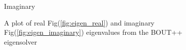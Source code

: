 \documentclass[12pt,a4paper]{article}
\begin{document}
\begin{figure}[H]
\begin{minipage}[H]{0.75\textwidth}
		\caption{Imaginary}
		\label{fig:eigen_imaginary}
	\end{minipage}
	\caption{A plot of real Fig(\ref{fig:eigen_real}) and imaginary Fig(\ref{fig:eigen_imaginary}) eigenvalues from the BOUT++ eigensolver}
	\label{fig:eigen_graphs}
\end{figure}
\end{document}
